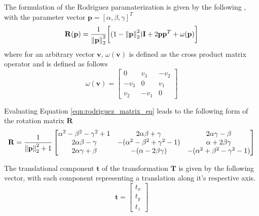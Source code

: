 The formulation of the Rodriguez paramaterization is given by the following 
\cite{Shuster1993}, with the parameter vector
$\mathbf{p} = [\alpha, \beta, \gamma]^{T}$
\begin{equation}
  \label{eqn:rodriguez_matrix_eq}
  \mathbf{R}(\mathbf{p}) =
  \frac{1}{\left\lVert\mathbf{p}\right\rVert_{2}^{2}}
  \bigg[
  (1 - \left\lVert\mathbf{p}\right\rVert_{2}^{2})\mathbf{I} +
  2 \mathbf{pp}^{T} + \omega(\mathbf{p})
  \bigg]
\end{equation}
where for an arbitrary vector $\mathbf{v}$, $\omega(\mathbf{v})$ is defined as
the cross product matrix operator and is defined as follows
\begin{equation}
  \label{eqn:cross_prod_mat}
  \omega(\mathbf{v}) =
  \begin{bmatrix}
    0 & v_{3} & -v_{2} \\
    -v_{3} & 0 & v_{1} \\
    v_{2} & -v_{1} & 0
  \end{bmatrix}
\end{equation}

Evaluating Equation \ref{eqn:rodriguez_matrix_eq} leads to the following form
of the rotation matrix $\mathbf{R}$
\begin{equation}
  \label{eqn:rodriguez_matrix}
  \mathbf{R} = \frac{1}{\left\lVert\mathbf{p}\right\rVert_{2}^{2} + 1}
  \begin{bmatrix}
    \alpha^{2} - \beta^{2} - \gamma^{2} + 1 &
    2 \alpha \beta + \gamma &
    2 \alpha \gamma - \beta \\
    2 \alpha \beta - \gamma &
    -(\alpha^{2} - \beta^{2} + \gamma^{2} - 1) &
    \alpha + 2 \beta \gamma \\
    2 \alpha \gamma + \beta &
    -(\alpha - 2 \beta \gamma) &
    -(\alpha^{2} + \beta^{2} - \gamma^{2} - 1)
  \end{bmatrix}
\end{equation}

The translational component $\mathbf{t}$ of the transformation $\mathbf{T}$ is
given by the following vector, with each component representing a translation
along it's respective axis.
\begin{equation}
  \label{eqn:trans_vector}
  \mathbf{t} =
  \begin{bmatrix}
    t_{x} \\
    t_{y} \\
    t_{z}
  \end{bmatrix}
\end{equation}

